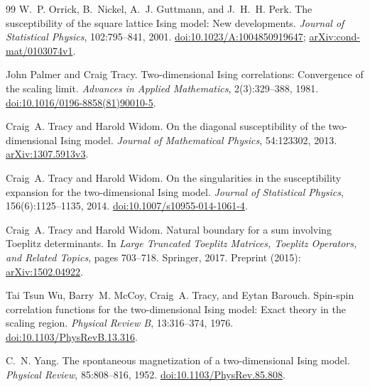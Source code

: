 \documentclass[11pt]{article}
\numberwithin{equation}{section}
\theoremstyle{definition}
\begin{document}
\begin{thebibliography}{99}
W.~P. Orrick, B.~Nickel, A.~J. Guttmann, and J.~H.~H. Perk.
\newblock The susceptibility of the square lattice {Ising} model:
New developments.
\newblock \emph{Journal of Statistical Physics}, 102:795--841, 2001.
\newblock \href{https://doi.org/10.1023/A:1004850919647}{doi:10.1023/A:1004850919647};
\href{https://arxiv.org/abs/cond-mat/0103074v1}{arXiv:cond-mat/0103074v1}.

John Palmer and Craig Tracy.
\newblock Two-dimensional {Ising} correlations: Convergence of the scaling limit.
\newblock \emph{Advances in Applied Mathematics}, 2(3):329--388, 1981.
\newblock \href{https://doi.org/10.1016/0196-8858(81)90010-5}{doi:10.1016/0196-8858(81)90010-5}.

Craig~A. Tracy and Harold Widom.
\newblock On the diagonal susceptibility of the two-dimensional {Ising} model.
\newblock \emph{Journal of Mathematical Physics}, 54:123302, 2013.
\newblock \href{https://arxiv.org/abs/1307.5913v3}{arXiv:1307.5913v3}.

Craig~A. Tracy and Harold Widom.
\newblock On the singularities in the susceptibility expansion for the
two-dimensional {Ising} model.
\newblock \emph{Journal of Statistical Physics}, 156(6):1125--1135, 2014.
\newblock \href{https://doi.org/10.1007/s10955-014-1061-4}{doi:10.1007/s10955-014-1061-4}.

Craig~A. Tracy and Harold Widom.
\newblock Natural boundary for a sum involving {Toeplitz} determinants.
\newblock In \emph{Large Truncated Toeplitz Matrices, Toeplitz Operators,
and Related Topics}, pages 703--718. Springer, 2017.
\newblock Preprint (2015):
\href{https://arxiv.org/abs/1502.04922}{arXiv:1502.04922}.

Tai Tsun Wu, Barry~M. McCoy, Craig~A. Tracy, and Eytan Barouch.
\newblock Spin-spin correlation functions for the two-dimensional {Ising}
model: Exact theory in the scaling region.
\newblock \emph{Physical Review B}, 13:316--374, 1976.
\newblock \href{https://doi.org/10.1103/PhysRevB.13.316}{doi:10.1103/PhysRevB.13.316}.

C.~N. Yang.
\newblock The spontaneous magnetization of a two-dimensional {Ising} model.
\newblock \emph{Physical Review}, 85:808--816, 1952.
\newblock \href{https://doi.org/10.1103/PhysRev.85.808}{doi:10.1103/PhysRev.85.808}.

\end{thebibliography}
\end{document}
